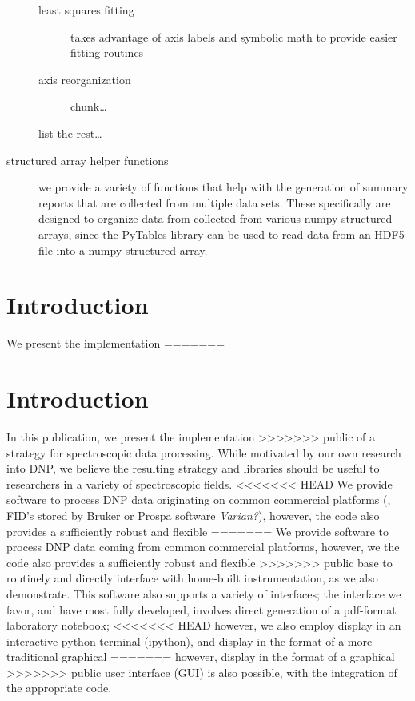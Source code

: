 \begin{description}
\begin{description}
            \item[least squares fitting] takes advantage of axis labels and
                symbolic math to provide easier fitting routines
            \item[axis reorganization] chunk\ldots
            \item[list the rest\ldots]  
        \end{description}
    \item[structured array helper functions]  
        we provide a variety of functions that help with the generation of
        summary reports that are collected from multiple data sets.
        These specifically are designed to organize data from
        collected from various numpy structured arrays,
        since the PyTables library can be used to read data from an HDF5 file
        into a numpy structured array.
\end{description}
\section{Introduction}\label{sec:writeup_software_intro}
We present the implementation
=======
\section{Introduction}\label{sec:writeup_software_intro}
In this publication,
    we present the implementation
>>>>>>> public
    of a strategy for spectroscopic data processing.
While motivated by our own research into DNP,
    we believe the resulting strategy and libraries
    should be useful to researchers in a variety of spectroscopic fields.
<<<<<<< HEAD
We provide software to process DNP data originating on common commercial platforms (\ie, FID's stored by Bruker or Prospa software \textit{Varian?}),
    however, the code also provides a sufficiently robust and flexible
=======
We provide software to process DNP data coming from common commercial platforms,
    however, we the code also provides a sufficiently robust and flexible
>>>>>>> public
    base to routinely and directly interface with home-built instrumentation,
    as we also demonstrate.
This software also supports a variety of interfaces;
    the interface we favor, and have most fully developed,
    involves direct generation
    of a pdf-format laboratory notebook;
<<<<<<< HEAD
    however, we also employ display in an interactive
    python terminal (ipython),
    and display in the format of a more traditional graphical
=======
    however, display in the format of a graphical
>>>>>>> public
    user interface (GUI) is also possible,
    with the integration of the appropriate code.
